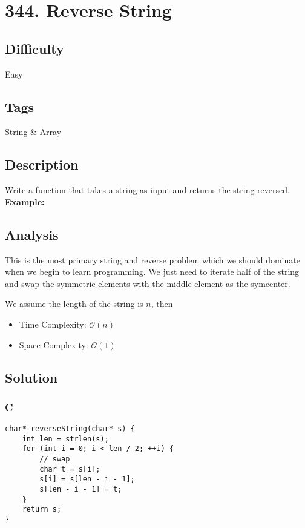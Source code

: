 \tocless\section{344. Reverse String}
\label{algo:344}

\subsection*{Difficulty}
Easy

\subsection*{Tags}
String \& Array

\subsection*{Description}
Write a function that takes a string as input and returns the string reversed. \\
\textbf{Example:}


\subsection*{Analysis}
This is the most primary string and reverse problem which we should dominate when we begin to learn programming. We just need to iterate half of the string and swap the symmetric elements with the middle element as the symcenter.

We assume the length of the string is $n$, then

\begin{itemize}
    \item Time Complexity: $\mathcal{O}(n)$
    \item Space Complexity: $\mathcal{O}(1)$
\end{itemize}

\subsection*{Solution}
\subsubsection*{C}
\begin{verbatim}
char* reverseString(char* s) {
    int len = strlen(s);
    for (int i = 0; i < len / 2; ++i) {
        // swap
        char t = s[i];
        s[i] = s[len - i - 1];
        s[len - i - 1] = t;
    }
    return s;
}
\end{verbatim}

\newpage


